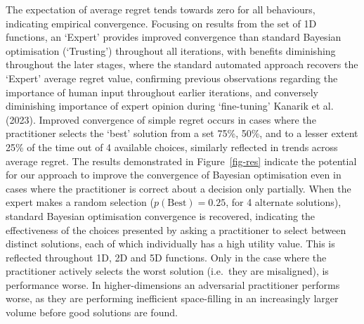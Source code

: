 \documentclass[
  letterpaper,
  DIV=11,
  numbers=noendperiod,
  oneside]{scrartcl}
\begin{document}
The expectation of average regret tends towards zero for all behaviours,
indicating empirical convergence. Focusing on results from the set of 1D
functions, an `Expert' provides improved convergence than standard
Bayesian optimisation (`Trusting') throughout all iterations, with
benefits diminishing throughout the later stages, where the standard
automated approach recovers the `Expert' average regret value,
confirming previous observations regarding the importance of human input
throughout earlier iterations, and conversely diminishing importance of
expert opinion during `fine-tuning' Kanarik et al.
(2023).
Improved convergence of simple regret occurs in cases where the
practitioner selects the `best' solution from a set 75\%, 50\%, and to a
lesser extent 25\% of the time out of 4 available choices, similarly
reflected in trends across average regret. The results demonstrated in
Figure~\ref{fig-res} indicate the potential for our approach to improve
the convergence of Bayesian optimisation even in cases where the
practitioner is correct about a decision only partially. When the expert
makes a random selection (\(p(\text{Best}) = 0.25\), for 4 alternate
solutions), standard Bayesian optimisation convergence is recovered,
indicating the effectiveness of the choices presented by asking a
practitioner to select between distinct solutions, each of which
individually has a high utility value. This is reflected throughout 1D,
2D and 5D functions. Only in the case where the practitioner actively
selects the worst solution (i.e.~they are misaligned), is performance
worse. In higher-dimensions an adversarial practitioner performs worse,
as they are performing inefficient space-filling in an increasingly
larger volume before good solutions are found.
\end{document}
